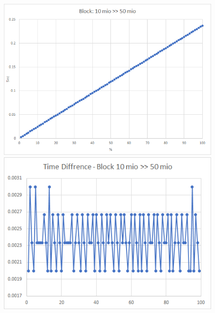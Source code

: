 \documentclass{TUBAFarbeiten}
\begin{document}
\begin{figure}[H]
\label{fig:Block10-50}
\includegraphics[scale=0.9]{Block10-50}
\begin{center}
\includegraphics[scale=1]{Block10-50-Time}
\end{center}
\end{figure}
\end{document}
